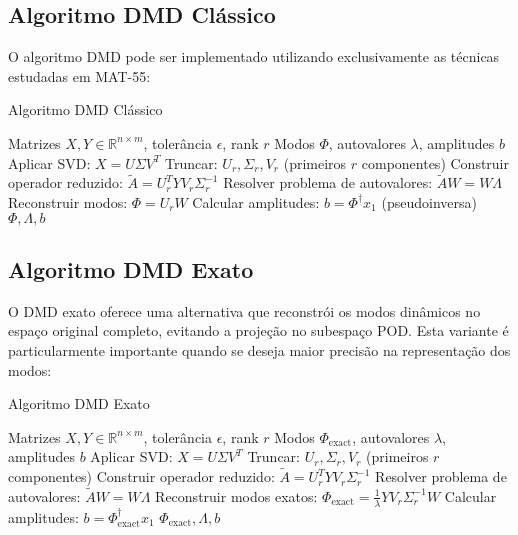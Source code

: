 \documentclass[a4,11pt]{pssbmac}
\begin{document}
\subsection{Algoritmo DMD Clássico}

O algoritmo DMD pode ser implementado utilizando exclusivamente as técnicas estudadas em MAT-55:

\begin{algorithm}
\caption{Algoritmo DMD Clássico}
\begin{algorithmic}[1]
\REQUIRE Matrizes $X, Y \in \mathbb{R}^{n \times m}$, tolerância $\epsilon$, rank $r$
\ENSURE Modos $\Phi$, autovalores $\lambda$, amplitudes $b$
\STATE Aplicar SVD: $X = U\Sigma V^T$
\STATE Truncar: $U_r, \Sigma_r, V_r$ (primeiros $r$ componentes)
\STATE Construir operador reduzido: $\tilde{A} = U_r^T Y V_r \Sigma_r^{-1}$
\STATE Resolver problema de autovalores: $\tilde{A}W = W\Lambda$
\STATE Reconstruir modos: $\Phi = U_r W$
\STATE Calcular amplitudes: $b = \Phi^{\dagger} x_1$ (pseudoinversa)
\RETURN $\Phi, \Lambda, b$
\end{algorithmic}
\end{algorithm}

\subsection{Algoritmo DMD Exato}

O DMD exato oferece uma alternativa que reconstrói os modos dinâmicos no espaço original completo, evitando a projeção no subespaço POD. Esta variante é particularmente importante quando se deseja maior precisão na representação dos modos:

\begin{algorithm}
\caption{Algoritmo DMD Exato}
\begin{algorithmic}[1]
\REQUIRE Matrizes $X, Y \in \mathbb{R}^{n \times m}$, tolerância $\epsilon$, rank $r$
\ENSURE Modos $\Phi_{\text{exact}}$, autovalores $\lambda$, amplitudes $b$
\STATE Aplicar SVD: $X = U\Sigma V^T$
\STATE Truncar: $U_r, \Sigma_r, V_r$ (primeiros $r$ componentes)
\STATE Construir operador reduzido: $\tilde{A} = U_r^T Y V_r \Sigma_r^{-1}$
\STATE Resolver problema de autovalores: $\tilde{A}W = W\Lambda$
\STATE Reconstruir modos exatos: $\Phi_{\text{exact}} = \frac{1}{\lambda} Y V_r \Sigma_r^{-1} W$
\STATE Calcular amplitudes: $b = \Phi_{\text{exact}}^{\dagger} x_1$
\RETURN $\Phi_{\text{exact}}, \Lambda, b$
\end{algorithmic}
\end{algorithm}
\end{document}
